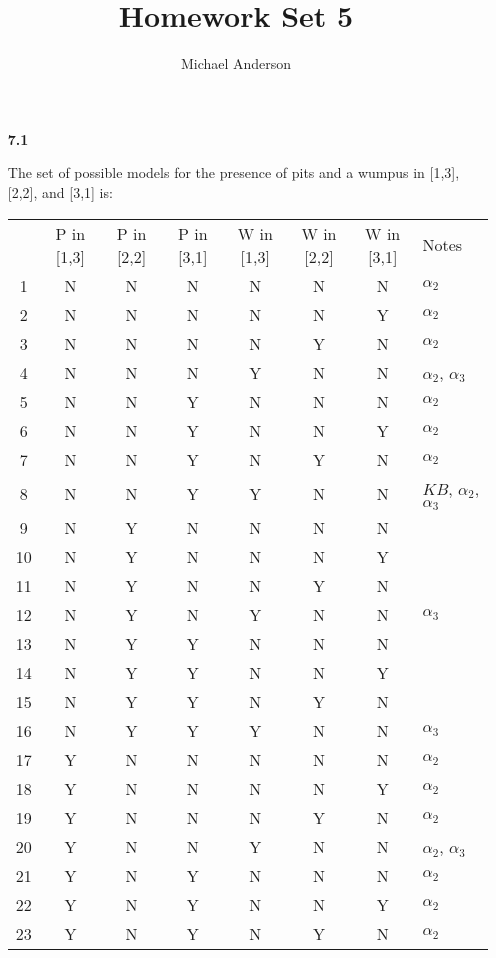 \documentclass{article}
\author{Michael Anderson}
\title{Homework Set 5}
\begin{document}
\maketitle
\newpage
\begin{enumerate}
\item[\textbf{7.1}]

The set of possible models for the presence of pits and a wumpus in [1,3],[2,2], and [3,1] is:\\

\begin{tabular}{ c c c c c c c l }

& P in [1,3] & P in [2,2] & P in [3,1] & W in [1,3] & W in [2,2] & W in [3,1] & Notes\\
1 & N & N & N & N & N & N & $\alpha_2$ \\
2 & N & N & N & N & N & Y & $\alpha_2$ \\
3 & N & N & N & N & Y & N & $\alpha_2$ \\
4 & N & N & N & Y & N & N & $\alpha_2$, $\alpha_3$ \\
5 & N & N & Y & N & N & N & $\alpha_2$ \\
6 & N & N & Y & N & N & Y & $\alpha_2$ \\
7 & N & N & Y & N & Y & N & $\alpha_2$ \\
8 & N & N & Y & Y & N & N & $KB$, $\alpha_2$, $\alpha_3$ \\
9 & N & Y & N & N & N & N & \\
10 & N & Y & N & N & N & Y & \\
11 & N & Y & N & N & Y & N & \\
12 & N & Y & N & Y & N & N & $\alpha_3$ \\
13 & N & Y & Y & N & N & N & \\
14 & N & Y & Y & N & N & Y & \\
15 & N & Y & Y & N & Y & N & \\
16 & N & Y & Y & Y & N & N & $\alpha_3$ \\
17 & Y & N & N & N & N & N & $\alpha_2$ \\
18 & Y & N & N & N & N & Y & $\alpha_2$ \\
19 & Y & N & N & N & Y & N & $\alpha_2$ \\
20 & Y & N & N & Y & N & N & $\alpha_2$, $\alpha_3$ \\
21 & Y & N & Y & N & N & N & $\alpha_2$ \\
22 & Y & N & Y & N & N & Y & $\alpha_2$ \\
23 & Y & N & Y & N & Y & N & $\alpha_2$ \\

\end{tabular}
\end{enumerate}
\end{document}
